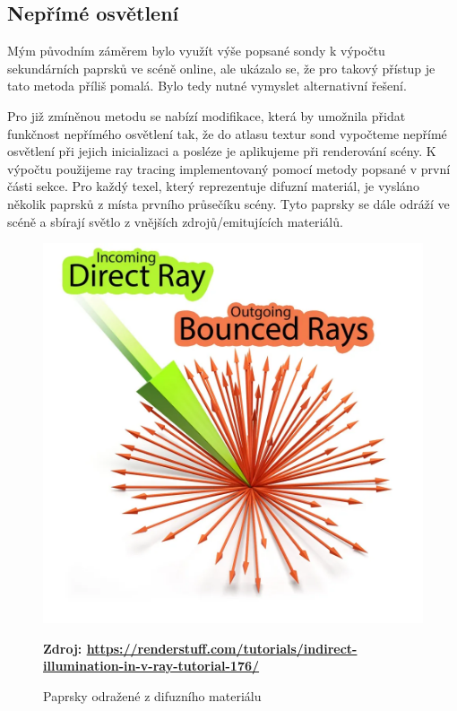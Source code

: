 \subsection{Nepřímé osvětlení}
Mým původním záměrem bylo využít výše popsané sondy k výpočtu sekundárních paprsků ve scéně online, ale ukázalo se, že pro takový přístup je tato metoda příliš pomalá. Bylo tedy nutné vymyslet alternativní řešení. 

Pro již zmíněnou metodu se nabízí modifikace, která by umožnila přidat funkčnost nepřímého osvětlení tak, že do atlasu textur sond vypočteme nepřímé osvětlení při jejich inicializaci a posléze je aplikujeme při renderování scény.  K výpočtu použijeme ray tracing implementovaný pomocí metody popsané v první části sekce. Pro každý texel, který reprezentuje difuzní materiál, je vysláno několik paprsků z místa prvního průsečíku scény. Tyto paprsky se dále odráží ve scéně a sbírají světlo z vnějších zdrojů/emitujících materiálů.


\begin{figure}[H]
	\centering
	\includegraphics[scale=0.15]{images/diffuse_bounce.png}
	\caption{Paprsky odražené z difuzního materiálu}
	\textbf{Zdroj: \url{https://renderstuff.com/tutorials/indirect-illumination-in-v-ray-tutorial-176/}}
	\label{fig:diffuse_rays}
\end{figure}


